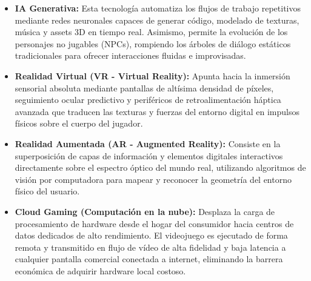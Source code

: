 \documentclass[12pt]{report}
\begin{document}
\begin{itemize}
    \item \textbf{IA Generativa:} Esta tecnología automatiza los flujos de trabajo repetitivos mediante redes neuronales capaces de generar código, modelado de texturas, música y assets 3D en tiempo real. Asimismo, permite la evolución de los personajes no jugables (NPCs), rompiendo los árboles de diálogo estáticos tradicionales para ofrecer interacciones fluidas e improvisadas.
    \item \textbf{Realidad Virtual (VR - Virtual Reality):} Apunta hacia la inmersión sensorial absoluta mediante pantallas de altísima densidad de píxeles, seguimiento ocular predictivo y periféricos de retroalimentación háptica avanzada que traducen las texturas y fuerzas del entorno digital en impulsos físicos sobre el cuerpo del jugador.
    \item \textbf{Realidad Aumentada (AR - Augmented Reality):} Consiste en la superposición de capas de información y elementos digitales interactivos directamente sobre el espectro óptico del mundo real, utilizando algoritmos de visión por computadora para mapear y reconocer la geometría del entorno físico del usuario.
    \item \textbf{Cloud Gaming (Computación en la nube):} Desplaza la carga de procesamiento de hardware desde el hogar del consumidor hacia centros de datos dedicados de alto rendimiento. El videojuego es ejecutado de forma remota y transmitido en flujo de vídeo de alta fidelidad y baja latencia a cualquier pantalla comercial conectada a internet, eliminando la barrera económica de adquirir hardware local costoso.
\end{itemize}
\end{document}
